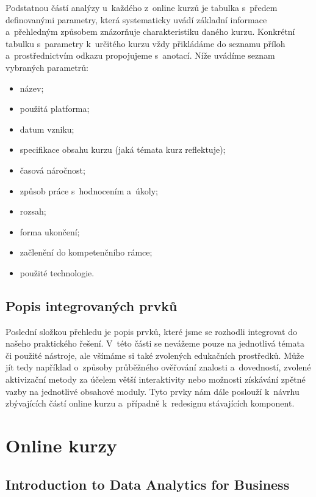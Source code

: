 Podstatnou částí analýzy u~každého z~online kurzů je tabulka s~předem definovanými parametry, která systematicky uvádí základní informace a~přehledným způsobem znázorňuje charakteristiku daného kurzu. Konkrétní tabulku s~parametry k~určitého kurzu vždy přikládáme do seznamu příloh a~prostřednictvím odkazu propojujeme s~anotací. Níže uvádíme seznam vybraných parametrů:

\begin{itemize}
\tightlist
\item
  název;
\item
  použitá platforma;
\item
  datum vzniku;
\item
  specifikace obsahu kurzu (jaká témata kurz reflektuje);
\item
  časová náročnost;
\item
  způsob práce s~hodnocením a~úkoly;
\item
  rozsah;
\item
  forma ukončení;
\item
  začlenění do kompetenčního rámce;
\item
  použité technologie.
\end{itemize}

\hypertarget{popis-integrovanuxfdch-prvkux16f}{%
\subsection{Popis integrovaných prvků}\label{popis-integrovanuxfdch-prvkux16f}}

Poslední složkou přehledu je popis prvků, které jsme se rozhodli integrovat do našeho praktického řešení. V~této části se nevážeme pouze na jednotlivá témata či použité nástroje, ale všímáme si také zvolených edukačních prostředků. Může jít tedy například o~způsoby průběžného ověřování znalosti a~dovedností, zvolené aktivizační metody za účelem větší interaktivity nebo možnosti získávání zpětné vazby na jednotlivé obsahové moduly. Tyto prvky nám dále poslouží k~návrhu zbývajících částí online kurzu a~případně k~redesignu stávajících komponent.

\hypertarget{online-kurzy}{%
\section{Online kurzy}\label{online-kurzy}}

\hypertarget{introduction-to-data-analytics-for-business}{%
\subsection{Introduction to Data Analytics for Business}\label{introduction-to-data-analytics-for-business}}

